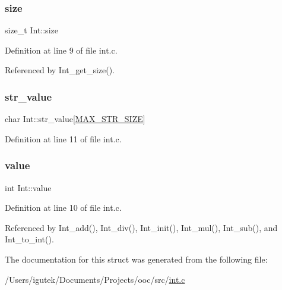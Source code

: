 \subsubsection{\texorpdfstring{size}{size}}
{\footnotesize\ttfamily size\+\_\+t Int\+::size}



Definition at line 9 of file int.\+c.



Referenced by Int\+\_\+get\+\_\+size().

\mbox{\label{structInt_a22a0684391962593f1320ab5039e4642}} 
\subsubsection{\texorpdfstring{str\+\_\+value}{str\_value}}
{\footnotesize\ttfamily char Int\+::str\+\_\+value\mbox{[}\mbox{\hyperlink{int_8c_a9c6918fbdb610a62c848aa680b81eb9a}{M\+A\+X\+\_\+\+S\+T\+R\+\_\+\+S\+I\+ZE}}\mbox{]}}



Definition at line 11 of file int.\+c.

\mbox{\label{structInt_ab131a0721b22e28accfb39f0195413ab}} 
\subsubsection{\texorpdfstring{value}{value}}
{\footnotesize\ttfamily int Int\+::value}



Definition at line 10 of file int.\+c.



Referenced by Int\+\_\+add(), Int\+\_\+div(), Int\+\_\+init(), Int\+\_\+mul(), Int\+\_\+sub(), and Int\+\_\+to\+\_\+int().



The documentation for this struct was generated from the following file\+:\begin{DoxyCompactItemize}
\item 
/\+Users/igutek/\+Documents/\+Projects/ooc/src/\mbox{\hyperlink{int_8c}{int.\+c}}\end{DoxyCompactItemize}
